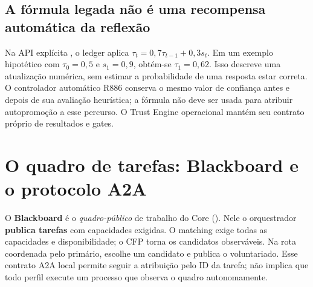
\subsection{A fórmula legada não é uma recompensa automática da reflexão}

Na API explícita , o ledger aplica
$\tau_t=0{,}7\tau_{t-1}+0{,}3s_t$. Em um exemplo hipotético com
$\tau_0=0{,}5$ e $s_1=0{,}9$, obtém-se $\tau_1=0{,}62$.
Isso descreve uma atualização numérica, sem estimar a probabilidade de uma
resposta estar correta. O controlador automático R886 conserva o mesmo valor
de confiança antes e depois de sua avaliação heurística; a fórmula não deve
ser usada para atribuir autopromoção a esse percurso. O Trust Engine operacional
mantém seu contrato próprio de resultados e gates.

\section{O quadro de tarefas: Blackboard e o protocolo A2A}

\begin{definicao}
O \textbf{Blackboard} é o \emph{quadro-público} de trabalho do Core
(). Nele o orquestrador \textbf{publica tarefas} com
capacidades exigidas. O matching exige todas as capacidades e disponibilidade;
o CFP torna os candidatos observáveis. Na rota coordenada pelo primário,
 escolhe um candidato e publica o voluntariado. Esse contrato A2A
local permite seguir a atribuição pelo ID da tarefa; não implica que todo
perfil execute um processo que observa o quadro autonomamente.
\end{definicao}

